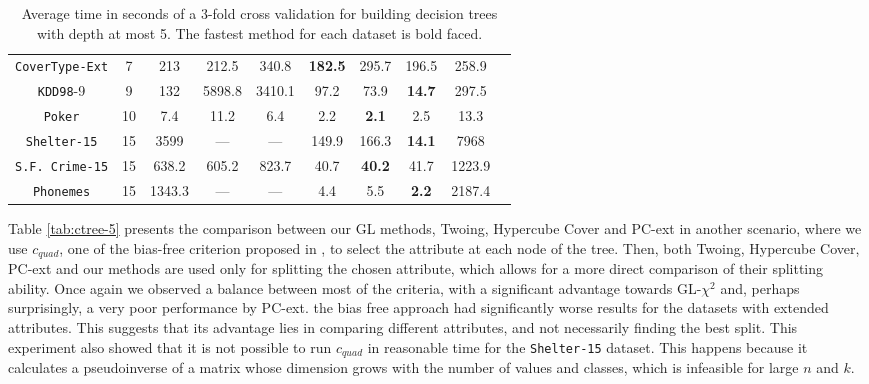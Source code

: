\begin{table}[]
\begin{tabular}{c|c|c|c|c|c|c|c|c|c}
{\tt CoverType-Ext} & 7  & 213        & 212.5      & 340.8       &{\bf 182.5}& 295.7      & 196.5      & 258.9      &            \\
{\tt KDD98}-9       & 9  & 132        & 5898.8     & 3410.1      & 97.2      & 73.9       & {\bf 14.7 }& 297.5      &            \\ 
{\tt Poker}         & 10 & 7.4        & 11.2       & 6.4         & 2.2       & {\bf 2.1}  & 2.5        & 13.3       &            \\
{\tt Shelter-15}    & 15 & 3599       & ---        & ---         & 149.9     & 166.3      & {\bf 14.1 }& 7968       &            \\   
{\tt S.F. Crime-15} & 15 & 638.2      & 605.2      & 823.7       & 40.7      & {\bf 40.2} & 41.7       & 1223.9     &            \\ 
{\tt Phonemes}      & 15 & 1343.3     & ---        & ---         & 4.4       & 5.5        & {\bf 2.2 } & 2187.4     &
\end{tabular}
\caption{Average time in seconds of a 3-fold cross validation for building decision trees with depth at most 5. The fastest method for each dataset is bold faced.}
\label{tab:time-5}
\end{table}



Table \ref{tab:ctree-5} presents the 
comparison between our GL methods, Twoing, Hypercube Cover and PC-ext in another scenario,
where we use $c_{quad}$, one of the bias-free criterion proposed in \cite{Hothorn:2006:URP}, to select the attribute at each node of the tree. 
Then, both Twoing, Hypercube Cover, PC-ext and our methods are  used only for splitting the chosen attribute, which allows for a  more direct comparison of their splitting ability. Once again we observed a balance between most of the criteria, with a significant advantage towards GL-$\chi^2$ and, perhaps surprisingly, a very poor performance by PC-ext. the bias free approach had significantly worse results for the datasets with extended attributes. This suggests that its advantage lies in comparing different attributes, and not necessarily finding the best split. This experiment also showed that it is not possible to run $c_{quad}$ in reasonable time for the {\tt Shelter-15} dataset. This happens because it calculates a pseudoinverse of a matrix whose dimension grows with the number of values and classes, which is infeasible for large $n$ and $k$.


